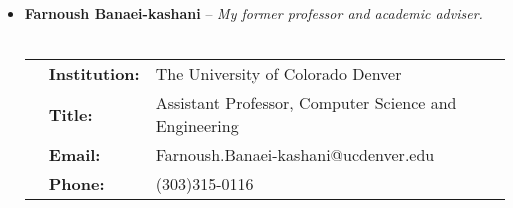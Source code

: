 {\begin{itemize}
         \vspace{5pt}
            \item{\textbf{Farnoush Banaei-kashani} -- \textit{My former professor and academic adviser.} }\\\\
            \begin{tabular}{p{50pt} p{60pt} p{300pt}}
                  & \textbf{Institution:}   & {The University of Colorado Denver} \\
                  & \textbf{Title:}         & {Assistant Professor, Computer Science and Engineering} \\
                  & \textbf{Email:}         & {Farnoush.Banaei-kashani@ucdenver.edu} \\
                  & \textbf{Phone:}         & {(303)315-0116} \\
            \end{tabular}

            
        
    \end{itemize}
}